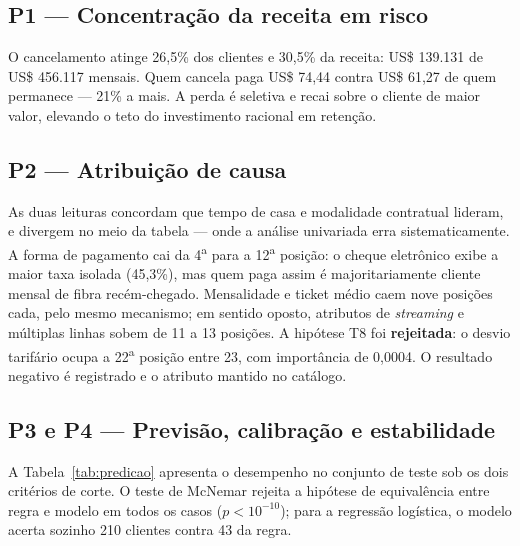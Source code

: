 \documentclass[10pt,a4paper]{article}
\begin{document}
\subsection{P1 --- Concentração da receita em risco}

O cancelamento atinge 26,5\% dos clientes e 30,5\% da receita: US\$ 139.131 de US\$ 456.117
mensais. Quem cancela paga US\$ 74,44 contra US\$ 61,27 de quem permanece --- 21\% a mais. A
perda é seletiva e recai sobre o cliente de maior valor, elevando o teto do investimento
racional em retenção.

\subsection{P2 --- Atribuição de causa}

As duas leituras concordam que tempo de casa e modalidade contratual lideram, e divergem no
meio da tabela --- onde a análise univariada erra sistematicamente. A forma de pagamento cai da
4\textsuperscript{a} para a 12\textsuperscript{a} posição: o cheque eletrônico exibe a maior
taxa isolada (45,3\%), mas quem paga assim é majoritariamente cliente mensal de fibra
recém-chegado. Mensalidade e ticket médio caem nove posições cada, pelo mesmo mecanismo; em
sentido oposto, atributos de \emph{streaming} e múltiplas linhas sobem de 11 a 13 posições.
A hipótese T8 foi \textbf{rejeitada}: o desvio tarifário ocupa a 22\textsuperscript{a} posição
entre 23, com importância de 0,0004. O resultado negativo é registrado e o atributo mantido no
catálogo.

\subsection{P3 e P4 --- Previsão, calibração e estabilidade}

A Tabela~\ref{tab:predicao} apresenta o desempenho no conjunto de teste sob os dois
critérios de corte. O teste de McNemar rejeita a hipótese de equivalência entre regra e
modelo em todos os casos (\(p < 10^{-10}\)); para a regressão logística, o modelo acerta
sozinho 210 clientes contra 43 da regra.
\end{document}

